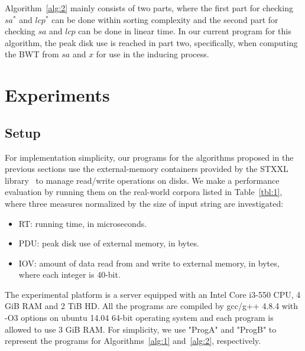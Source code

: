 \documentclass[10pt,journal,compsoc]{IEEEtran}
\begin{document}
Algorithm~\ref{alg:2} mainly consists of two parts, where the first part for checking $sa^*$ and $lcp^*$ can be done within sorting complexity and the second part for checking $sa$ and $lcp$ can be done in linear time. In our current program for this algorithm, the peak disk use is reached in part two, specifically, when computing the BWT from $sa$ and $x$ for use in the inducing process. 

\section{Experiments} \label{sec:experiment}

\subsection{Setup} \label{sec:experiment:setup}

For implementation simplicity, our programs for the algorithms proposed in the previous sections use the external-memory containers provided by the STXXL library~\cite{Dementiev2007} to manage read/write operations on disks. We make a performance evaluation by running them on the real-world corpora listed in Table~\ref{tbl:1}, where three measures normalized by the size of input string are investigated:

\begin{itemize}
	
	\item RT: running time, in microseconds.
	
	\item PDU: peak disk use of external memory, in bytes.
	
	\item IOV: amount of data read from and write to external memory, in bytes, where each integer is 40-bit.
	
\end{itemize}

The experimental platform is a server equipped with an Intel Core i3-550 CPU, 4 GiB RAM and 2 TiB HD. All the programs are compiled by gcc/g++ 4.8.4 with -O3 options on ubuntu 14.04 64-bit operating system and each program is allowed to use 3 GiB RAM. For simplicity, we use "ProgA" and "ProgB" to represent the programs for Algorithms~\ref{alg:1} and~\ref{alg:2}, respectively.
\end{document}
